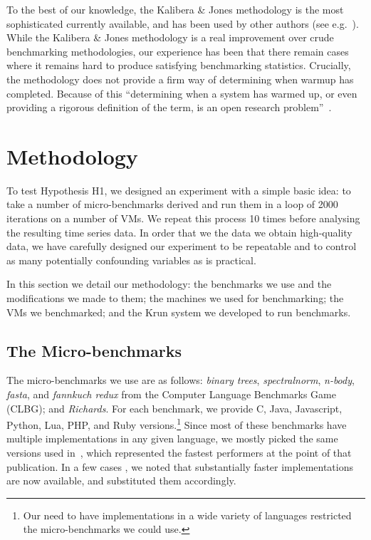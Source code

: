 \documentclass[10pt,preprint]{sigplanconf}
\newcommand{\kalibera}{Kalibera \& Jones\xspace}
\newcommand{\krun}{Krun\xspace}
\newcommand{\binarytrees}{\emph{binary trees}\xspace}
\newcommand{\richards}{\emph{Richards}\xspace}
\newcommand{\spectralnorm}{\emph{spectralnorm}\xspace}
\newcommand{\nbody}{\emph{n-body}\xspace}
\newcommand{\fasta}{\emph{fasta}\xspace}
\newcommand{\fannkuch}{\emph{fannkuch redux}\xspace}
\begin{document}
To the best of our knowledge, the \kalibera methodology is the most
sophisticated currently available, and has been used by other authors (see
e.g.~\cite{barrett15approaches,grimmer15dynamically}). While the \kalibera
methodology is a real improvement over crude benchmarking methodologies,
our experience has been that there remain cases where it remains hard to produce
satisfying benchmarking statistics. Crucially, the methodology does not
provide a firm way of determining when warmup has completed. Because of this
``determining when a system has warmed up, or even providing a
rigorous definition of the term, is an open research problem''~\cite{seaton15phd}.


\section{Methodology}
\label{sec:methodology}

To test Hypothesis H1, we designed an experiment with a simple basic idea: to
take a number of micro-benchmarks derived and
run them in a loop of 2000 iterations on a number of VMs. We repeat this
process 10 times before analysing the resulting time series data. In order
that we the data we obtain high-quality data, we have carefully designed our
experiment to be repeatable and to control as many potentially confounding variables as
is practical.

In this section we detail our methodology: the benchmarks we use and the
modifications we made to them; the machines we used for benchmarking; the VMs we
benchmarked; and the \krun system we developed to run benchmarks.


\subsection{The Micro-benchmarks}

The micro-benchmarks we use are as follows: \binarytrees, \spectralnorm, \nbody,
\fasta, and \fannkuch from the Computer Language Benchmarks Game (CLBG); and
\richards. For each benchmark, we provide C, Java, Javascript, Python, Lua, PHP,
and Ruby versions.\footnote{Our need to have implementations in a wide variety
of languages restricted the micro-benchmarks we could use.} Since most of these
benchmarks have multiple implementations in any given language, we mostly picked
the same versions used in~\cite{bolz14impact}, which represented the fastest
performers at the point of that publication. In a few cases , we noted that
substantially faster implementations are now available, and substituted them
accordingly.
\end{document}

